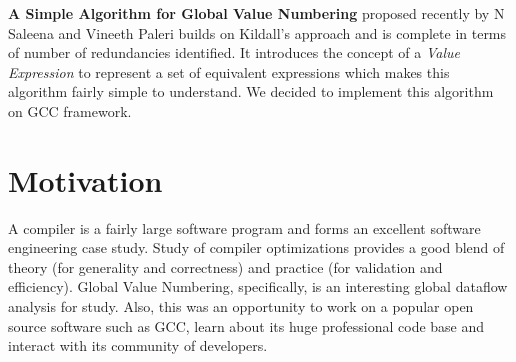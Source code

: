 \textbf{A Simple Algorithm for Global Value Numbering} proposed recently by N Saleena and Vineeth Paleri\cite{sagvn} builds on Kildall's approach and is complete in terms of number of redundancies identified. It introduces the concept of a \emph{Value Expression} to represent a set of equivalent expressions which makes this algorithm fairly simple to understand. We decided to implement this algorithm on GCC framework.

\section{Motivation}
A compiler is a fairly large software program and forms an excellent software engineering case study. Study of compiler optimizations provides a good blend of theory (for generality and correctness) and practice (for validation and efficiency). Global Value Numbering, specifically, is an interesting global dataflow analysis for study. Also, this was an opportunity to work on a popular open source software such as GCC, learn about its huge professional code base and interact with its community of developers.
